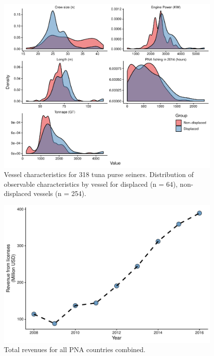 \documentclass[12pt]{article}
\begin{document}
\begin{figure}
\centering
\includegraphics{img/balance_density_plot.pdf}
\caption{\label{fig:balance_density_plot}Vessel characteristics for 318 tuna purse seiners. Distribution of observable characteristics by vessel for displaced (n = 64), non-displaced vessels (n = 254).}
\end{figure}

\begin{figure}
\centering
	\includegraphics{img/total_PNA_revenues.pdf}
	\caption{\label{fig:total_PNA_revenues}Total revenues for all PNA countries combined.}
\end{figure}
\end{document}
